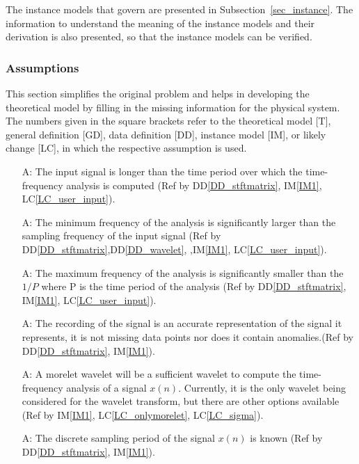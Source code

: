 \documentclass[12pt]{article}
\newcounter{assumpnum} %
\begin{document}
The instance models that govern \progname{} are presented in
Subsection~\ref{sec_instance}.  The information to understand the meaning of the
instance models and their derivation is also presented, so that the instance
models can be verified.

\subsubsection{Assumptions} \label{sec_assumpt}

This section simplifies the original problem and helps in developing the
theoretical model by filling in the missing information for the physical
system. The numbers given in the square brackets refer to the theoretical model
[T], general definition [GD], data definition [DD], instance model [IM], or
likely change [LC], in which the respective assumption is used.

\begin{itemize}

\item[A\refstepcounter{assumpnum}\theassumpnum \label{mintime_assum}:] The input signal is longer than the time period over which the time-frequency analysis is computed (Ref by DD\ref{DD_stftmatrix}, IM\ref{IM1}, LC\ref{LC_user_input}).
\item[A\refstepcounter{assumpnum}\theassumpnum \label{minfreq_assum}:] The minimum frequency of the analysis is significantly larger than the sampling frequency of the input signal (Ref by DD\ref{DD_stftmatrix},DD\ref{DD_wavelet}, ,IM\ref{IM1}, LC\ref{LC_user_input}).
\item[A\refstepcounter{assumpnum}\theassumpnum \label{maxfreq_assum}:] The maximum frequency of the analysis is significantly smaller than the $1/P$ where P is the time period of the analysis (Ref by DD\ref{DD_stftmatrix}, IM\ref{IM1}, LC\ref{LC_user_input}).
\item[A\refstepcounter{assumpnum}\theassumpnum \label{representation_assum}:]The recording of the signal is an accurate representation of the signal it represents, it is not missing data points nor does it contain anomalies.(Ref by DD\ref{DD_stftmatrix}, IM\ref{IM1}).
\item[A\refstepcounter{assumpnum}\theassumpnum \label{morelet_assum}:]A morelet wavelet will be a sufficient wavelet to compute the time-frequency analysis of a signal $x(n)$. Currently, it is the only wavelet being considered for the wavelet transform, but there are other options available (Ref by IM\ref{IM1}, LC\ref{LC_onlymorelet}, LC\ref{LC_sigma}).
\item[A\refstepcounter{assumpnum}\theassumpnum \label{P_assum}:]The discrete sampling period of the signal $x(n)$ is known (Ref by DD\ref{DD_stftmatrix}, IM\ref{IM1}).

\end{itemize}
\end{document}
